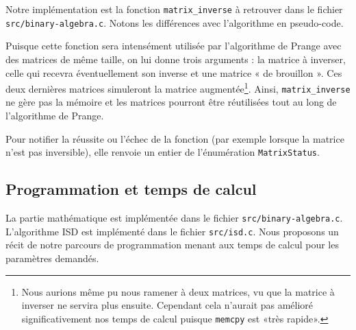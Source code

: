 \documentclass[11pt,a4paper]{article}
\begin{document}
Notre implémentation est la fonction \verb+matrix_inverse+ à retrouver dans le
fichier \texttt{src/binary-algebra.c}.
Notons les différences avec l'algorithme en pseudo-code.

Puisque cette fonction sera intensément utilisée par l'algorithme de Prange avec
des matrices de même taille, on lui donne trois arguments : la matrice à
inverser, celle qui recevra éventuellement son inverse et une matrice « de
brouillon ». Ces deux dernières matrices simuleront la matrice
augmentée\footnote{Nous aurions même pu nous ramener à deux matrices, vu que la
matrice à inverser ne servira plus ensuite. Cependant cela n'aurait pas amélioré significativement nos temps de calcul puisque \texttt{memcpy} est «très rapide».}. 
Ainsi, \verb+matrix_inverse+ ne gère pas la mémoire et les matrices pourront
être réutilisées tout au long de l'algorithme de Prange.

Pour notifier la réussite ou l'échec de la fonction (par exemple lorsque la
matrice n'est pas inversible), elle renvoie un entier de l'énumération
\verb+MatrixStatus+.

%
%

\subsection{Programmation et temps de calcul}

La partie mathématique est implémentée dans le fichier
\texttt{src/binary-algebra.c}.
L'algorithme ISD est implémenté dans le fichier \texttt{src/isd.c}.
Nous proposons un récit de notre parcours de programmation menant aux temps de
calcul pour les paramètres demandés.
\end{document}

